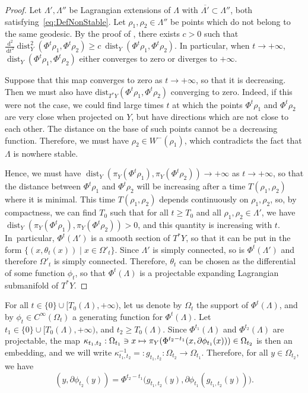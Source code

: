 \documentclass[10pt]{amsart}
\newcommand\mto{\mathchoice{\longmapsto}{\mapsto}{\mapsto}{\mapsto}}
\let\sep\mid
\newcommand{\rd}{\,\mathrm{d}}
\DeclareMathOperator{\dist}{dist}
\theoremstyle{plain}
\theoremstyle{definition}
\begin{document}
\begin{proof}
Let $\Lambda', \Lambda''$ be Lagrangian extensions of $\Lambda$ with $\overline{\Lambda'}\subset \Lambda''$, both satisfying~\eqref{eq:DefNonStable}. Let $\rho_1,\rho_2\in \Lambda''$ be points which do not belong to the same geodesic. By the proof of \cite[Th.\,4.8.2]{Jost}, there exists $c>0$ such that $ \frac{\rd ^2}{\rd t^2} \dist_Y^2(\Phi^t \rho_1,\Phi^t \rho_2) \geq c~ \dist_Y(\Phi^t \rho_1,\Phi^t \rho_2)$. In particular, when $t\to +\infty$, $\dist_Y(\Phi^t \rho_1,\Phi^t \rho_2) $ either converges to zero or diverges to $+\infty$.

Suppose that this map converges to zero as $t\to +\infty$, so that it is decreasing. Then we must also have $\mathrm{dist}_{T^*Y}(\Phi^t \rho_1,\Phi^t \rho_2)$ converging to zero. Indeed, if this were not the case, we could find large times $t$ at which the points $\Phi^t \rho_1$ and $\Phi^t \rho_2$ are very close when projected on $Y$, but have directions which are not close to each other. The distance on the base of such points cannot be a decreasing function. Therefore, we must have $\rho_2\in W^-(\rho_1)$, which contradicts the fact that $\Lambda$ is nowhere stable.

Hence, we must have $\dist_Y(\pi_Y(\Phi^t \rho_1),\pi_Y(\Phi^t \rho_2))\to +\infty$ as $t\to+\infty$, so that the distance between $\Phi^t \rho_1$ and $\Phi^t \rho_2$ will be increasing after a time $T(\rho_1,\rho_2)$ where it is minimal. This time $T(\rho_1, \rho_2)$ depends continuously on $\rho_1,\rho_2$, so, by compactness, we can find $T_0$ such that for all $t\geq T_0$ and all $\rho_1,\rho_2 \in \Lambda'$, we have $\dist_Y(\pi_Y(\Phi^t \rho_1),\pi_Y(\Phi^t \rho_2))>0$, and this quantity is increasing with $t$. In~particular, $\Phi^t(\Lambda')$ is a smooth section of $T^*Y$, so that it can be put in the form $\{(x, \theta_{t}(x))\sep x\in \Omega'_{t} \}$. Since $\Lambda'$ is simply connected, so is $\Phi^t(\Lambda')$ and therefore $\Omega'_{t}$ is simply connected. Therefore, $\theta_t$ can be chosen as the differential of some function $\phi_t$, so that $\Phi^t(\Lambda)$ is a projectable expanding Lagrangian submanifold of $T^*Y$.
\end{proof}

For all $t \in \{0\}\cup [T_0(\Lambda), +\infty)$, let us denote by $\Omega_t$ the support of $\Phi^t(\Lambda)$, and by $\phi_{t}\in C^\infty(\Omega_{t})$ a generating function for $\Phi^{t}(\Lambda)$.
Let $t_1\in \{0\}\cup [T_0(\Lambda), +\infty)$, and $t_2 \geq T_0(\Lambda)$. Since $\Phi^{t_1}(\Lambda)$ and $\Phi^{t_2}(\Lambda)$ are projectable, the map $\kappa_{t_1,t_2}:\Omega_{t_1}\ni x \mto\pi_Y(\Phi^{t_2-t_1}(x,\partial\phi_{t_1}(x)))\in\Omega_{t_2}$ is then an embedding, and we will write $\kappa_{t_1,t_2}^{-1} =: g_{t_1,t_2}:\Omega_{t_2}\to\Omega_{t_1}$. Therefore, for all $y\in \Omega_{t_2}$, we have
\begin{equation}\label{eq:DefG}
(y,\partial\phi_{t_2}(y))=\Phi^{t_2-t_1} \bigl(g_{t_1,t_2}(y),\partial\phi_{t_1}(g_{t_1,t_2}(y)) \bigr).
\end{equation}
\end{document}
